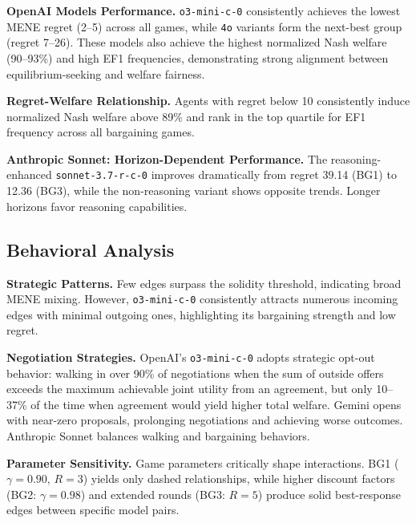 \documentclass{article}
\theoremstyle{plain}
\theoremstyle{definition}
\theoremstyle{remark}
\begin{document}
\textbf{OpenAI Models Performance.}
\texttt{o3-mini-c-0} consistently achieves the lowest MENE regret (2–5) across all games, while \texttt{4o} variants form the next-best group (regret 7–26). These models also achieve the highest normalized Nash welfare (90–93\%) and high EF1 frequencies, demonstrating strong alignment between equilibrium-seeking and welfare fairness.

\textbf{Regret-Welfare Relationship.}
Agents with regret below 10 consistently induce normalized Nash welfare above 89\% and rank in the top quartile for EF1 frequency across all bargaining games.


\textbf{Anthropic Sonnet: Horizon-Dependent Performance.}
The reasoning-enhanced \texttt{sonnet-3.7-r-c-0} improves dramatically from regret 39.14 (BG1) to 12.36 (BG3), while the non-reasoning variant shows opposite trends. Longer horizons favor reasoning capabilities.

\subsection{Behavioral Analysis}
\label{sec:llm-only-games-qual-findings}

\textbf{Strategic Patterns.}
Few edges surpass the solidity threshold, indicating broad MENE mixing. However, \texttt{o3-mini-c-0} consistently attracts numerous incoming edges with minimal outgoing ones, highlighting its bargaining strength and low regret.

\textbf{Negotiation Strategies.}  
OpenAI's \texttt{o3-mini-c-0} adopts strategic opt-out behavior: walking in over 90\% of negotiations when the sum of outside offers exceeds the maximum achievable joint utility from an agreement, but only 10–37\% of the time when agreement would yield higher total welfare. Gemini opens with near-zero proposals, prolonging negotiations and achieving worse outcomes. Anthropic Sonnet balances walking and bargaining behaviors.

\textbf{Parameter Sensitivity.}
Game parameters critically shape interactions. BG1 ($\gamma=0.90$, $R=3$) yields only dashed relationships, while higher discount factors (BG2: $\gamma=0.98$) and extended rounds (BG3: $R=5$) produce solid best-response edges between specific model pairs.
\end{document}
